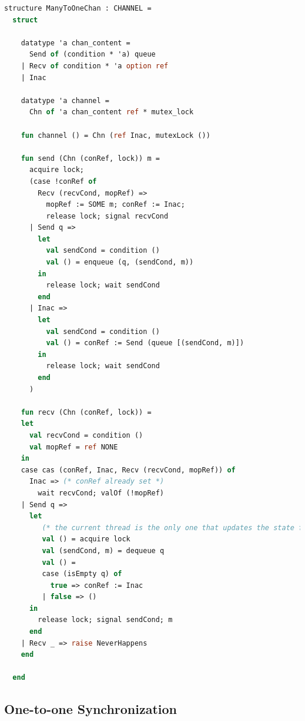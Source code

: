 \documentclass[10pt]{article}
\begin{document}
\begin{lstlisting}[language=ML, mathescape]
  structure ManyToOneChan : CHANNEL =
  struct

    datatype 'a chan_content =
      Send of (condition * 'a) queue
    | Recv of condition * 'a option ref
    | Inac

    datatype 'a channel =
      Chn of 'a chan_content ref * mutex_lock

    fun channel () = Chn (ref Inac, mutexLock ())

    fun send (Chn (conRef, lock)) m = 
      acquire lock;
      (case !conRef of
        Recv (recvCond, mopRef) => 
          mopRef := SOME m; conRef := Inac;
          release lock; signal recvCond
      | Send q =>
        let
          val sendCond = condition ()
          val () = enqueue (q, (sendCond, m))
        in
          release lock; wait sendCond
        end
      | Inac =>
        let
          val sendCond = condition ()
          val () = conRef := Send (queue [(sendCond, m)])
        in
          release lock; wait sendCond
        end 
      )

    fun recv (Chn (conRef, lock)) =
    let
      val recvCond = condition () 
      val mopRef = ref NONE 
    in
    case cas (conRef, Inac, Recv (recvCond, mopRef)) of
      Inac => (* conRef already set *)
        wait recvCond; valOf (!mopRef)
    | Send q =>
      let
         (* the current thread is the only one that updates the state from this state *)
         val () = acquire lock
         val (sendCond, m) = dequeue q 
         val () =
         case (isEmpty q) of
           true => conRef := Inac
         | false => ()
      in
        release lock; signal sendCond; m
      end
    | Recv _ => raise NeverHappens
    end
          
  end

\end{lstlisting}

\subsection{One-to-one Synchronization}
\end{document}
